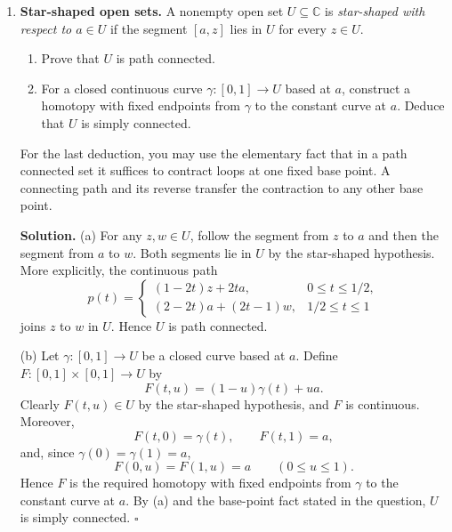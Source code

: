 \documentclass[12pt,reqno]{amsart}
\newcommand{\C}{\mathbb{C}}
\newenvironment{solution}
  {\par\smallskip\begin{tcolorbox}[breakable,enhanced,colback=solblue,colframe=solframe,
   boxrule=0.5pt,arc=2pt,left=6pt,right=6pt,top=4pt,bottom=4pt]\noindent\textbf{Solution.}}
  {\hfill$\square$\end{tcolorbox}\par\medskip}
\begin{document}
\begin{enumerate}
\begin{solution}
\medskip
\noindent (b) Put $A=\sqrt{a^2+b^2}$ and choose $\theta$ as in the
hint, so that $Ae^{i\theta}=a+ib$. Integrating $e^{-Az}$ around the
positively oriented sector of radius $R$ and angle $\theta$ gives
\[
0=\int_0^R e^{-Ax}\,dx+\int_{B_R}e^{-Az}\,dz
       -e^{i\theta}\int_0^R e^{-(a+ib)x}\,dx,
\]
where $B_R$ is the circular arc. On this arc, $z=Re^{i\phi}$ with
$0\leq\phi\leq\theta$, so that
\[
|e^{-Az}|=e^{-AR\cos\phi}\leq e^{-AR\cos\theta}=e^{-aR}.
\]
Consequently
\[
\left|\int_{B_R}e^{-Az}\,dz\right|
 \leq R\theta e^{-aR}\longrightarrow0.
\]
Also $|e^{-(a+ib)x}|=e^{-ax}$ is integrable on $[0,\infty)$, so
all the ray integrals converge absolutely. Letting $R\to\infty$,
we obtain
\[
\int_0^\infty e^{-(a+ib)x}\,dx
 =\frac{e^{-i\theta}}{A}=\frac{a-ib}{a^2+b^2}.
\]
Taking real parts now gives
\[
\boxed{\displaystyle\int_0^\infty e^{-ax}\cos(bx)\,dx
       =\frac{a}{a^2+b^2}.}
\]
\end{solution}

\item \textbf{Star-shaped open sets.}
A nonempty open set $U\subseteq\C$ is \emph{star-shaped with respect
to $a\in U$} if the segment $[a,z]$ lies in $U$ for every $z\in U$.
\begin{enumerate}
\item Prove that $U$ is path connected.
\item For a closed continuous curve $\gamma:[0,1]\to U$ based at $a$,
construct a homotopy with fixed endpoints from $\gamma$ to the constant
curve at $a$. Deduce that $U$ is simply connected.
\end{enumerate}
For the last deduction, you may use the elementary fact that in a path
connected set it suffices to contract loops at one fixed base point.
A connecting path and its reverse transfer the contraction to any
other base point.

\begin{solution}
\noindent (a) For any $z,w\in U$, follow the segment from $z$ to $a$
and then the segment from $a$ to $w$. Both segments lie in $U$ by the
star-shaped hypothesis. More explicitly, the continuous path
\[
p(t)=\begin{cases}
 (1-2t)z+2ta,&0\leq t\leq1/2,\\
 (2-2t)a+(2t-1)w,&1/2\leq t\leq1
\end{cases}
\]
joins $z$ to $w$ in $U$. Hence $U$ is path connected.

\medskip
\noindent (b) Let $\gamma:[0,1]\to U$ be a closed curve based at $a$.
Define $F:[0,1]\times[0,1]\to U$ by
\[
F(t,u)=(1-u)\gamma(t)+ua.
\]
Clearly $F(t,u)\in U$ by the star-shaped hypothesis, and $F$ is
continuous. Moreover,
\[
F(t,0)=\gamma(t),\qquad F(t,1)=a,
\]
and, since $\gamma(0)=\gamma(1)=a$,
\[
F(0,u)=F(1,u)=a\qquad(0\leq u\leq1).
\]
Hence $F$ is the required homotopy with fixed endpoints from $\gamma$
to the constant curve at $a$. By (a) and the base-point fact stated in
the question, $U$ is simply connected.
\end{solution}


\end{enumerate}
\end{document}
